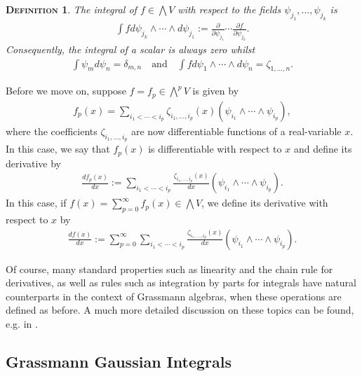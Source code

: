 \documentclass[12pt,twoside]{amsart}
\newtheorem{defi}{\textsc{Definition}}[section]
\numberwithin{equation}{section}
\begin{document}
\begin{defi}\label{integrals} The integral of $f \in \bigwedge V$ with respect to the fields $\psi_{j_{1}},...,\psi_{j_{k}}$ is 
\begin{eqnarray}
\int f d\psi_{j_{k}}\wedge \cdots \wedge d\psi_{j_{1}} := \frac{\partial}{\partial \psi_{j_{1}}}\cdots \frac{\partial f}{\partial \psi_{j_{k}}}. \label{GA15}
\end{eqnarray}
Consequently, the integral of a scalar is always zero whilst
\begin{eqnarray}
\int \psi_{m} d\psi_{n} = \delta_{m,n} \quad \mbox{and} \quad \int f d\psi_{1}\wedge \cdots \wedge d\psi_{n} = \zeta_{1,...,n}. \label{GA16}
\end{eqnarray}
\end{defi}

Before we move on, suppose $f = f_{p} \in \bigwedge^{p}V$ is given by
\begin{eqnarray}
f_{p}(x) =  \sum_{i_{1}<\cdots < i_{p}}\zeta_{i_{1},...,i_{p}}(x) (\psi_{i_{1}}\wedge \cdots \wedge \psi_{i_{p}}), \label{GA17}
\end{eqnarray}
where the coefficients $\zeta_{i_{1},...,i_{p}}$ are now differentiable functions of a real-variable $x$. In this case, we say that $f_{p}(x)$ is differentiable with respect to $x$ and define its derivative by 
\begin{eqnarray}
\frac{d f_{p}(x)}{dx} := \sum_{i_{1}<\cdots < i_{p}}\frac{\zeta_{i_{1},...,i_{p}}(x)}{dx} (\psi_{i_{1}}\wedge \cdots \wedge \psi_{i_{p}}). \label{GA18}
\end{eqnarray}
In this case, if $f(x) = \sum_{p=0}^{\infty}f_{p}(x) \in \bigwedge V$, we define its derivative with respect to $x$ by
\begin{eqnarray}
\frac{d f(x)}{dx} := \sum_{p=0}^{\infty}\sum_{i_{1}<\cdots < i_{p}}\frac{\zeta_{i_{1},...,i_{p}}(x)}{dx} (\psi_{i_{1}}\wedge \cdots \wedge \psi_{i_{p}}). \label{GA19}
\end{eqnarray}

Of course, many standard properties such as linearity and the chain rule for derivatives, as well as rules such as integration  by parts for integrals have natural counterparts in the context of Grassmann algebras, when these operations are defined as before. A much more detailed discussion on these topics can be found, e.g. in \cite{berezin2013introduction, MSbook, FKTbook}.

\subsection{Grassmann Gaussian Integrals}\label{gaussianintegrals}
\end{document}
